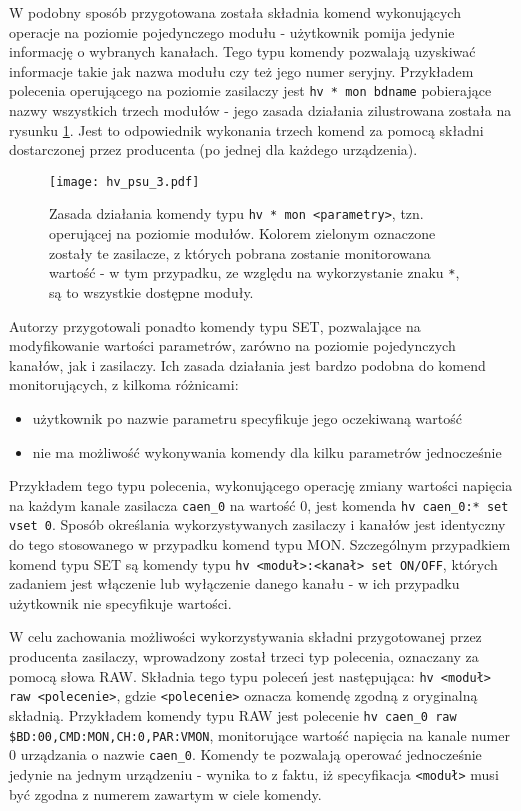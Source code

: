 W podobny sposób przygotowana została składnia komend wykonujących operacje na poziomie pojedynczego modułu - użytkownik pomija jedynie informację o wybranych kanałach. Tego typu komendy pozwalają uzyskiwać informacje takie jak nazwa modułu czy też jego numer seryjny. Przykładem polecenia operującego na poziomie zasilaczy jest \lstinline{hv * mon bdname} pobierające nazwy wszystkich trzech modułów - jego zasada działania zilustrowana została na rysunku \ref{fig:psu3}. Jest to odpowiednik wykonania trzech komend za pomocą składni dostarczonej przez producenta (po jednej dla każdego urządzenia).

\begin{figure}[H]
\centering
\texttt{[image: hv\_psu\_3.pdf]}
\caption{Zasada działania komendy typu \lstinline{hv * mon <parametry>}, tzn. operującej na poziomie modułów. Kolorem zielonym oznaczone zostały te zasilacze, z których pobrana zostanie monitorowana wartość - w tym przypadku, ze względu na wykorzystanie znaku \lstinline{*}, są to wszystkie dostępne moduły.}
\label{fig:psu3}
\end{figure}

Autorzy przygotowali ponadto komendy typu SET, pozwalające na modyfikowanie wartości parametrów, zarówno na poziomie pojedynczych kanałów, jak i zasilaczy. Ich zasada działania jest bardzo podobna do komend monitorujących, z kilkoma różnicami:
\begin{itemize}
    \item użytkownik po nazwie parametru specyfikuje jego oczekiwaną wartość
    \item nie ma możliwość wykonywania komendy dla kilku parametrów jednocześnie
\end{itemize}
Przykładem tego typu polecenia, wykonującego operację zmiany wartości napięcia na każdym kanale zasilacza \lstinline{caen_0} na wartość 0, jest komenda \lstinline{hv caen_0:* set vset 0}. Sposób określania wykorzystywanych zasilaczy i kanałów jest identyczny do tego stosowanego w przypadku komend typu MON. Szczególnym przypadkiem komend typu SET są komendy typu \lstinline{hv <moduł>:<kanał> set ON/OFF}, których zadaniem jest włączenie lub wyłączenie danego kanału - w ich przypadku użytkownik nie specyfikuje wartości.

W celu zachowania możliwości wykorzystywania składni przygotowanej przez producenta zasilaczy, wprowadzony został trzeci typ polecenia, oznaczany za pomocą słowa RAW. Składnia tego typu poleceń jest następująca: \lstinline{hv <moduł> raw <polecenie>}, gdzie \lstinline{<polecenie>} oznacza komendę zgodną z oryginalną składnią. Przykładem komendy typu RAW jest polecenie \lstinline{hv caen_0 raw $BD:00,CMD:MON,CH:0,PAR:VMON}, monitorujące wartość napięcia na kanale numer 0 urządzania o nazwie \lstinline{caen_0}. Komendy te pozwalają operować jednocześnie jedynie na jednym urządzeniu - wynika to z faktu, iż specyfikacja \lstinline{<moduł>} musi być zgodna z numerem zawartym w ciele komendy.

